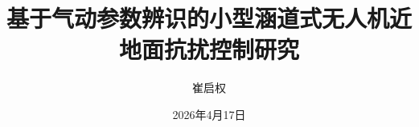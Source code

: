 \documentclass[unicode,master]{scut_thesis/scutthesis} %
\begin{document}
    \title{基于气动参数辨识的小型涵道式无人机近地面抗扰控制研究}	
    \author{崔启权}	
    \date{2026年4月17日}


    \maketitle	
    \frontmatter    %
    \tableofcontents	%
    \begingroup
        \renewcommand*{\addvspace}[1]{}
        \newcommand{\loflabel}{图} 
        \renewcommand{\numberline}[1]{\loflabel~#1\hspace*{1em}}	
        \listoffigures
        
        \newcommand{\lotlabel}{表}
        \renewcommand{\numberline}[1]{\lotlabel~#1\hspace*{1em}}
        \listoftables
    \endgroup


    \mainmatter %

    \pagestyle{fancy}	%

    

    

    

    

    
\end{document}
